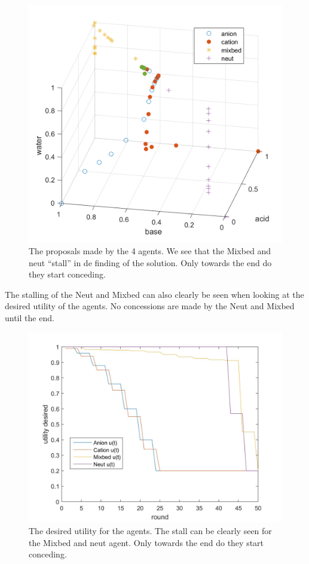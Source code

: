 \begin{figure}[h]
	\centering
	\includegraphics[width=0.7\linewidth]{img/reactive_4_plot}
	\caption{The proposals made by the 4 agents. We see that the Mixbed and neut ``stall'' in de finding of the solution. Only towards the end do they start conceding.}
	\label{fig:reactive4plot}
\end{figure}

The stalling of the Neut and Mixbed can also clearly be seen when looking at the desired utility of the agents. No concessions are made by the Neut and Mixbed until the end.

\begin{figure}[h]
	\centering
	\includegraphics[width=0.7\linewidth]{img/desiredutility_reactive_4}
	\caption{The desired utility for the agents. The stall can be clearly seen for the Mixbed and neut agent. Only towards the end do they start conceding.}
	\label{fig:desiredutilityreactive4}
\end{figure}



\clearpage
